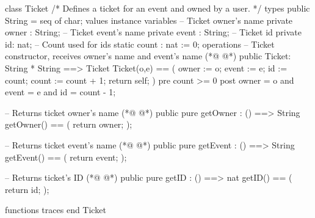\begin{vdmpp}[breaklines=true]
class Ticket
/*
  Defines a ticket for an event and owned by a user.
*/
types
 public String = seq of char;
values
instance variables
 -- Ticket owner's name
 private owner : String;
 -- Ticket event's name
 private event : String;
 -- Ticket id
 private id: nat;
 -- Count used for ids 
 static count : nat := 0;
operations
 -- Ticket constructor, receives owner's name and event's name
(*@
\label{Ticket:19}
@*)
 public Ticket: String * String ==> Ticket
 Ticket(o,e) == (
  owner := o; 
  event := e; 
  id := count; 
  count := count + 1;
  return self;
 )
 pre count >= 0
 post owner = o and event = e and id = count - 1;
 
 -- Returns ticket owner's name
(*@
\label{getOwner:31}
@*)
 public pure getOwner : () ==> String
 getOwner() == (
  return owner;
 );
 
 -- Returns ticket event's name
(*@
\label{getEvent:37}
@*)
 public pure getEvent : () ==> String
 getEvent() == (
  return event;
 );
 
 -- Returns ticket's ID
(*@
\label{getID:43}
@*)
 public pure getID : () ==> nat
 getID() == (
  return id;
 );
    
functions
traces
end Ticket
\end{vdmpp}
